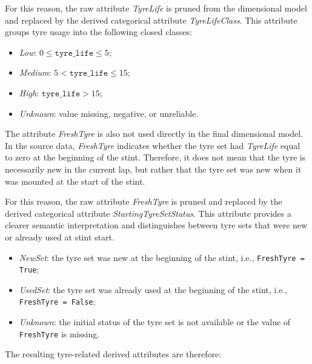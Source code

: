 \documentclass[a4paper,11pt]{article}
\begin{document}
	For this reason, the raw attribute \textit{TyreLife} is pruned from the dimensional model
	and replaced by the derived categorical attribute \textit{TyreLifeClass}. This attribute
	groups tyre usage into the following closed classes:
	
	\begin{itemize}
		\item \textit{Low}: $0 \leq \texttt{tyre\_life} \leq 5$;
		\item \textit{Medium}: $5 < \texttt{tyre\_life} \leq 15$;
		\item \textit{High}: $\texttt{tyre\_life} > 15$;
		\item \textit{Unknown}: value missing, negative, or unreliable.
	\end{itemize}
	
	The attribute \textit{FreshTyre} is also not used directly in the final dimensional model.
	In the source data, \textit{FreshTyre} indicates whether the tyre set had
	\textit{TyreLife} equal to zero at the beginning of the stint. Therefore, it does not mean
	that the tyre is necessarily new in the current lap, but rather that the tyre set was new
	when it was mounted at the start of the stint.
	
	For this reason, the raw attribute \textit{FreshTyre} is pruned and replaced by the
	derived categorical attribute \textit{StartingTyreSetStatus}. This attribute provides a
	clearer semantic interpretation and distinguishes between tyre sets that were new or
	already used at stint start.
	
	
	\begin{itemize}
		\item \textit{NewSet}: the tyre set was new at the beginning of the stint, i.e., \texttt{FreshTyre = True};
		\item \textit{UsedSet}: the tyre set was already used at the beginning of the stint, i.e., \texttt{FreshTyre = False};
		\item \textit{Unknown}: the initial status of the tyre set is not available or the value of \texttt{FreshTyre} is missing.
	\end{itemize}
	
	The resulting tyre-related derived attributes are therefore:
	
\end{document}
